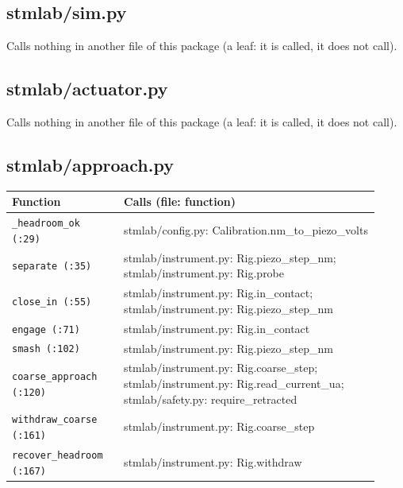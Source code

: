 \subsection{stmlab/sim.py}

Calls nothing in another file of this package (a leaf: it is called, it does not call).

\subsection{stmlab/actuator.py}

Calls nothing in another file of this package (a leaf: it is called, it does not call).

\subsection{stmlab/approach.py}

\small\setlength{\LTleft}{0pt}\setlength{\LTright}{\fill}
\begin{longtable}{@{}>{\raggedright\arraybackslash}p{0.280\linewidth}>{\raggedright\arraybackslash}p{0.640\linewidth}@{}}
\toprule
\textbf{Function} & \textbf{Calls (file: function)} \\
\midrule\endhead
\texttt{\_\discretionary{}{}{}headroom\_\discretionary{}{}{}ok (:29)} & stmlab/config.py: Calibration.nm\_to\_piezo\_volts \\
\texttt{separate (:35)} & stmlab/instrument.py: Rig.piezo\_step\_nm; stmlab/instrument.py: Rig.probe \\
\texttt{close\_\discretionary{}{}{}in (:55)} & stmlab/instrument.py: Rig.in\_contact; stmlab/instrument.py: Rig.piezo\_step\_nm \\
\texttt{engage (:71)} & stmlab/instrument.py: Rig.in\_contact \\
\texttt{smash (:102)} & stmlab/instrument.py: Rig.piezo\_step\_nm \\
\texttt{coarse\_\discretionary{}{}{}approach (:120)} & stmlab/instrument.py: Rig.coarse\_step; stmlab/instrument.py: Rig.read\_current\_ua; stmlab/safety.py: require\_retracted \\
\texttt{withdraw\_\discretionary{}{}{}coarse (:161)} & stmlab/instrument.py: Rig.coarse\_step \\
\texttt{recover\_\discretionary{}{}{}headroom (:167)} & stmlab/instrument.py: Rig.withdraw \\
\bottomrule
\end{longtable}
\normalsize

